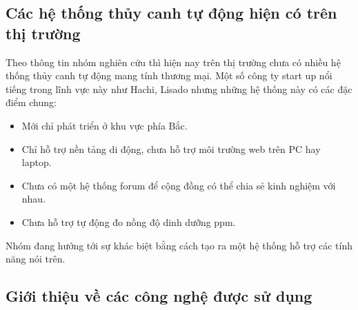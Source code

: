 \documentclass[a4paper,12pt,oneside]{article}
\begin{document}
\subsection{Các hệ thống thủy canh tự động hiện có trên thị trường}
\noindent Theo thông tin nhóm nghiên cứu thì hiện nay trên thị trường chưa có nhiều hệ thống thủy canh tự động mang tính thương mại. Một số công ty start up nổi tiếng trong lĩnh vực này như Hachi, Lisado nhưng những hệ thống này có các đặc điểm chung:
	\begin{itemize}
		\item Mới chỉ phát triển ở khu vực phía Bắc.
		\item Chỉ hỗ trợ nền tảng di động, chưa hỗ trợ môi trường web trên PC hay laptop.
		\item Chưa có một hệ thống forum để cộng đồng có thể chia sẻ kinh nghiệm với nhau.
		\item Chưa hỗ trợ tự động đo nồng độ dinh dưỡng ppm.
	\end{itemize} 
\noindent Nhóm đang hướng tới sự khác biệt bằng cách tạo ra một hệ thống hỗ trợ các tính năng nói trên.
\subsection{Giới thiệu về các công nghệ được sử dụng}
\end{document}
